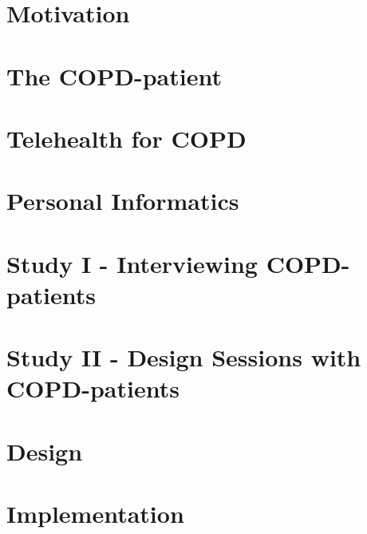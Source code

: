 
\usepackage{booktabs} %


\cleardoublepage
\cleardoublepage

\cleardoublepage

\begin{KeepFromToc}
	\tableofcontents
\end{KeepFromToc}

\chapter{Motivation}



\chapter{The COPD-patient}


\chapter{Telehealth for COPD}





\chapter{Personal Informatics}



\chapter{Study I - Interviewing COPD-patients} 



\chapter{Study II - Design Sessions with COPD-patients}


\chapter{Design}

\chapter{Implementation}

